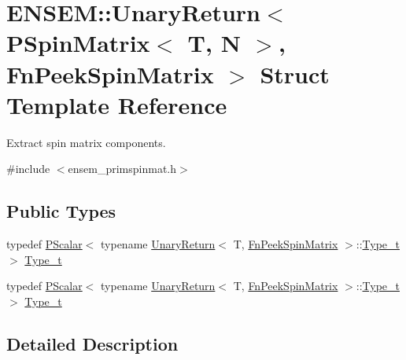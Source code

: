 \hypertarget{structENSEM_1_1UnaryReturn_3_01PSpinMatrix_3_01T_00_01N_01_4_00_01FnPeekSpinMatrix_01_4}{}\section{E\+N\+S\+EM\+:\+:Unary\+Return$<$ P\+Spin\+Matrix$<$ T, N $>$, Fn\+Peek\+Spin\+Matrix $>$ Struct Template Reference}
\label{structENSEM_1_1UnaryReturn_3_01PSpinMatrix_3_01T_00_01N_01_4_00_01FnPeekSpinMatrix_01_4}


Extract spin matrix components.  




{\ttfamily \#include $<$ensem\+\_\+primspinmat.\+h$>$}

\subsection*{Public Types}
\begin{DoxyCompactItemize}
\item 
typedef \mbox{\hyperlink{classENSEM_1_1PScalar}{P\+Scalar}}$<$ typename \mbox{\hyperlink{structENSEM_1_1UnaryReturn}{Unary\+Return}}$<$ T, \mbox{\hyperlink{structENSEM_1_1FnPeekSpinMatrix}{Fn\+Peek\+Spin\+Matrix}} $>$\+::\mbox{\hyperlink{structENSEM_1_1UnaryReturn_3_01PSpinMatrix_3_01T_00_01N_01_4_00_01FnPeekSpinMatrix_01_4_a1a718fe587d03e5619b75af54e2a19a3}{Type\+\_\+t}} $>$ \mbox{\hyperlink{structENSEM_1_1UnaryReturn_3_01PSpinMatrix_3_01T_00_01N_01_4_00_01FnPeekSpinMatrix_01_4_a1a718fe587d03e5619b75af54e2a19a3}{Type\+\_\+t}}
\item 
typedef \mbox{\hyperlink{classENSEM_1_1PScalar}{P\+Scalar}}$<$ typename \mbox{\hyperlink{structENSEM_1_1UnaryReturn}{Unary\+Return}}$<$ T, \mbox{\hyperlink{structENSEM_1_1FnPeekSpinMatrix}{Fn\+Peek\+Spin\+Matrix}} $>$\+::\mbox{\hyperlink{structENSEM_1_1UnaryReturn_3_01PSpinMatrix_3_01T_00_01N_01_4_00_01FnPeekSpinMatrix_01_4_a1a718fe587d03e5619b75af54e2a19a3}{Type\+\_\+t}} $>$ \mbox{\hyperlink{structENSEM_1_1UnaryReturn_3_01PSpinMatrix_3_01T_00_01N_01_4_00_01FnPeekSpinMatrix_01_4_a1a718fe587d03e5619b75af54e2a19a3}{Type\+\_\+t}}
\end{DoxyCompactItemize}


\subsection{Detailed Description}
